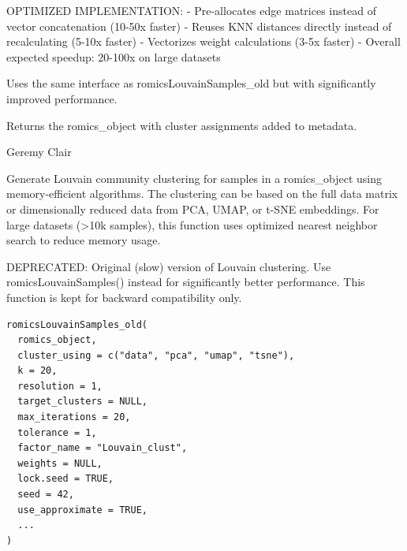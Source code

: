 \documentclass[a4paper]{book}
\begin{document}
%
\begin{Details}
OPTIMIZED IMPLEMENTATION:
- Pre-allocates edge matrices instead of vector concatenation (10-50x faster)
- Reuses KNN distances directly instead of recalculating (5-10x faster)
- Vectorizes weight calculations (3-5x faster)
- Overall expected speedup: 20-100x on large datasets

Uses the same interface as romicsLouvainSamples\_old but with significantly improved performance.
\end{Details}
%
\begin{Value}
Returns the romics\_object with cluster assignments added to metadata.
\end{Value}
%
\begin{Author}
Geremy Clair
\end{Author}
%
\begin{Description}
Generate Louvain community clustering for samples in a romics\_object using memory-efficient algorithms.
The clustering can be based on the full data matrix or dimensionally reduced data from PCA, UMAP, or t-SNE embeddings.
For large datasets (>10k samples), this function uses optimized nearest neighbor search to reduce memory usage.

DEPRECATED: Original (slow) version of Louvain clustering. Use romicsLouvainSamples() instead for significantly better performance.
This function is kept for backward compatibility only.
\end{Description}
%
\begin{Usage}
\begin{verbatim}
romicsLouvainSamples_old(
  romics_object,
  cluster_using = c("data", "pca", "umap", "tsne"),
  k = 20,
  resolution = 1,
  target_clusters = NULL,
  max_iterations = 20,
  tolerance = 1,
  factor_name = "Louvain_clust",
  weights = NULL,
  lock.seed = TRUE,
  seed = 42,
  use_approximate = TRUE,
  ...
)
\end{verbatim}
\end{Usage}
%
\end{document}
